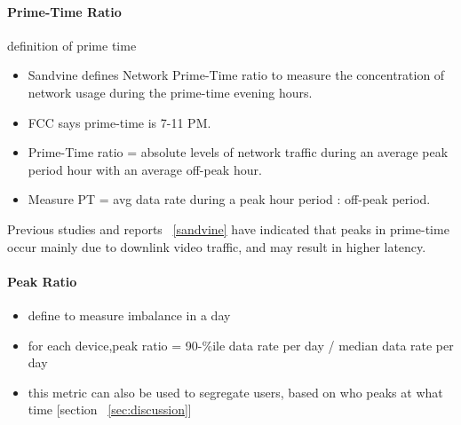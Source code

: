 \paragraph{Prime-Time Ratio} definition of prime time
\begin{itemize}
\itemsep0em 
\item Sandvine defines Network Prime-Time ratio to measure the concentration of network usage during the prime-time evening hours.
\item FCC says prime-time is 7-11 PM.
\item Prime-Time ratio = absolute levels of network traffic during an average peak period hour with an average off-peak hour.
\item Measure PT = avg data rate during a peak hour period : off-peak period.
\end{itemize}

 Previous studies and reports ~\ref{sandvine} have indicated that peaks in prime-time occur mainly due to downlink video traffic, and may result in higher latency.

\paragraph{Peak Ratio}
\begin{itemize}
\itemsep0em
\item define to measure imbalance in a day
\item for each device,peak ratio  =    90-\%ile data rate per day / median data rate per day
\item this metric can also be used to segregate users, based on who peaks at what time [section ~\ref{sec:discussion}]
\end{itemize}

